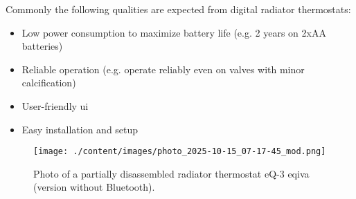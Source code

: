 Commonly the following qualities are expected from digital radiator thermostats:

\begin{itemize}
	\item Low power consumption to maximize battery life (e.g. 2 years on 2xAA batteries)
	\item Reliable operation (e.g. operate reliably even on valves with minor calcification)
	\item User-friendly \ac{ui}
	\item Easy installation and setup
\end{itemize}

\begin{figure}[htbp]
	\centering
	\texttt{[image: ./content/images/photo\_2025-10-15\_07-17-45\_mod.png]}
	\caption{Photo of a partially disassembled radiator thermostat eQ-3 eqiva (version without Bluetooth).}
	\label{fig:rt-photo}
\end{figure}